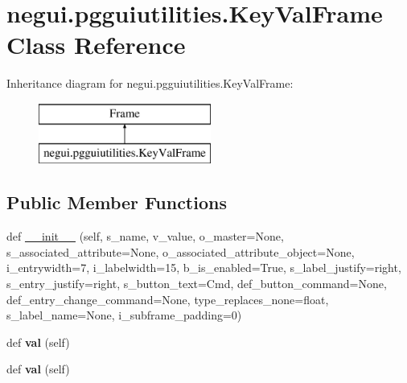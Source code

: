 \hypertarget{classnegui_1_1pgguiutilities_1_1KeyValFrame}{}\section{negui.\+pgguiutilities.\+Key\+Val\+Frame Class Reference}
\label{classnegui_1_1pgguiutilities_1_1KeyValFrame}
Inheritance diagram for negui.\+pgguiutilities.\+Key\+Val\+Frame\+:\begin{figure}[H]
\begin{center}
\leavevmode
\includegraphics[height=2.000000cm]{classnegui_1_1pgguiutilities_1_1KeyValFrame}
\end{center}
\end{figure}
\subsection*{Public Member Functions}
\begin{DoxyCompactItemize}
\item 
def \hyperlink{classnegui_1_1pgguiutilities_1_1KeyValFrame_aa8aa7bbb1c786d74386ed154a635d9f6}{\+\_\+\+\_\+init\+\_\+\+\_\+} (self, s\+\_\+name, v\+\_\+value, o\+\_\+master=None, s\+\_\+associated\+\_\+attribute=None, o\+\_\+associated\+\_\+attribute\+\_\+object=None, i\+\_\+entrywidth=7, i\+\_\+labelwidth=15, b\+\_\+is\+\_\+enabled=True, s\+\_\+label\+\_\+justify=\textquotesingle{}right\textquotesingle{}, s\+\_\+entry\+\_\+justify=\textquotesingle{}right\textquotesingle{}, s\+\_\+button\+\_\+text=\textquotesingle{}Cmd\textquotesingle{}, def\+\_\+button\+\_\+command=None, def\+\_\+entry\+\_\+change\+\_\+command=None, type\+\_\+replaces\+\_\+none=float, s\+\_\+label\+\_\+name=None, i\+\_\+subframe\+\_\+padding=0)
\item 
def {\bfseries val} (self)\hypertarget{classnegui_1_1pgguiutilities_1_1KeyValFrame_a735c32759de5e4519d15ec2511da6e4f}{}\label{classnegui_1_1pgguiutilities_1_1KeyValFrame_a735c32759de5e4519d15ec2511da6e4f}

\item 
def {\bfseries val} (self)\hypertarget{classnegui_1_1pgguiutilities_1_1KeyValFrame_a735c32759de5e4519d15ec2511da6e4f}{}\label{classnegui_1_1pgguiutilities_1_1KeyValFrame_a735c32759de5e4519d15ec2511da6e4f}

\end{DoxyCompactItemize}


